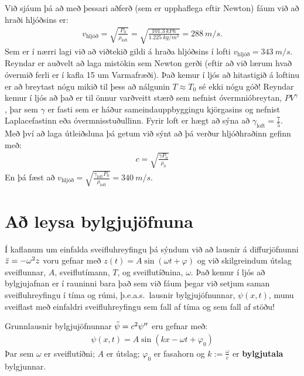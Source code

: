 Við sjáum þá að með þessari aðferð (sem er upphaflega eftir Newton) fáum við að hraði hljóðsins er:
\begin{align*}
    v_{\text{hljóð}} = \sqrt{\frac{P_0}{\rho_{\text{loft}}}} = \sqrt{\frac{\SI{101.3}{kPa}}{\SI{1.225}{kg/m^3}}} = \SI{288}{m/s}.
\end{align*}
Sem er í nærri lagi við að viðtekið gildi á hraða hljóðsins í lofti $v_{\text{hljóð}} = \SI{343}{m/s}$. Reyndar er auðvelt að laga mistökin sem Newton gerði (eftir að við lærum hvað óvermið ferli er í kafla 15 um Varmafræði). Það kemur í ljós að hitastigið á loftinu er að breytast nógu mikið til þess að nálgunin $T \approx T_0$ sé ekki nógu góð! Reyndar kemur í ljós að það er til önnur varðveitt stærð sem nefnist óvermnióbreytan, $PV^\gamma$, þar sem $\gamma$ er fasti sem er háður sameindauppbyggingu kjörgasins og nefnist Laplacefastinn eða óvermnisstuðullinn. Fyrir loft er hægt að sýna að $\gamma_{\text{loft}} = \frac{7}{5}$. Með því að laga útleiðsluna þá getum við sýnt að þá verður hljóðhraðinn gefinn með:
\begin{align*}
    c = \sqrt{\frac{\gamma P_0}{\rho_0}}
\end{align*}
En þá fæst að $v_{\text{hljóð}} = \sqrt{\frac{\gamma_{\text{loft}}P_0}{\rho_{\text{loft}}}} = \SI{340}{m/s}$.

\newpage

\section{Að leysa bylgjujöfnuna}

Í kaflanum um einfalda sveifluhreyfingu þá sýndum við að lausnir á diffurjöfnunni $\Ddot{z} = -\omega^2 z$ voru gefnar með $z(t) = A\sin(\omega t + \varphi)$ og við skilgreindum útslag sveiflunnar, $A$, sveiflutímann, $T$, og sveiflutíðnina, $\omega$. Það kemur í ljós að bylgjujafnan er í rauninni bara það sem við fáum þegar við setjum saman sveifluhreyfingu í tíma og rúmi, þ.e.a.s.~lausnir bylgjujöfnunnar, $\psi(x,t)$, munu sveiflast með einfaldri sveifluhreyfingu sem fall af tíma og sem fall af stöðu!

\begin{tcolorbox}
\begin{theorem}
Grunnlausnir bylgjujöfnunnar $\Ddot{\psi} = c^2 \psi''$ eru gefnar með:
\begin{align*}
    \psi(x,t) = A\sin(kx - \omega t + \varphi_0)
\end{align*}
Þar sem $\omega$ er sveiflutíðni; $A$ er útslag; $\varphi_0$ er fasahorn og $k := \frac{\omega}{c}$ er \textbf{bylgjutala} bylgjunnar.
\end{theorem}
\end{tcolorbox}

